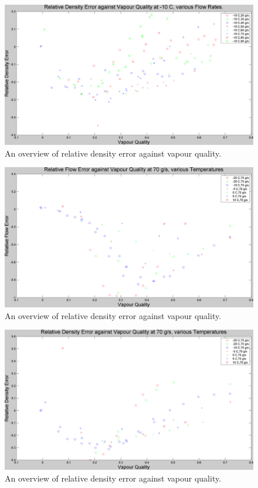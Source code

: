 \documentclass{report}
\begin{document}
\begin{figure}
\includegraphics[width=\textwidth]{plots/fig4}
\caption{An overview of relative density error against vapour quality.}
\label{plot:4}
\end{figure}

\begin{figure}
\includegraphics[width=\textwidth]{plots/fig5}
\caption{An overview of relative density error against vapour quality.}
\label{plot:5}
\end{figure}

\begin{figure}
\includegraphics[width=\textwidth]{plots/fig6}
\caption{An overview of relative density error against vapour quality.}
\label{plot:6}
\end{figure}
\end{document}
